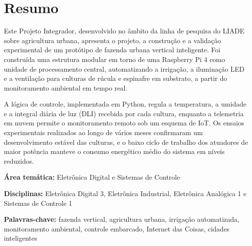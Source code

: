 \section*{Resumo}

Este Projeto Integrador, desenvolvido no âmbito da linha de pesquisa do LIADE sobre agricultura urbana, apresenta o projeto, a construção e a validação experimental de um protótipo de fazenda urbana vertical inteligente. Foi construída uma estrutura modular em torno de uma Raspberry Pi 4 como unidade de processamento central, automatizando a irrigação, a iluminação LED e a ventilação para culturas de rúcula e espinafre em substrato, a partir do monitoramento ambiental em tempo real.

A lógica de controle, implementada em Python, regula a temperatura, a umidade e a integral diária de luz (DLI) recebida por cada cultura, enquanto a telemetria em nuvem permite o monitoramento remoto sob um esquema de IoT. Os ensaios experimentais realizados ao longo de vários meses confirmaram um desenvolvimento estável das culturas, e o baixo ciclo de trabalho dos atuadores de maior potência manteve o consumo energético médio do sistema em níveis reduzidos.

\vspace{0.8cm}

\noindent\textbf{Área temática:} Eletrônica Digital e Sistemas de Controle

\vspace{0.4cm}

\noindent\textbf{Disciplinas:} Eletrônica Digital 3, Eletrônica Industrial, Eletrônica Analógica 1 e Sistemas de Controle 1

\vspace{0.4cm}

\noindent\textbf{Palavras-chave:} fazenda vertical, agricultura urbana, irrigação automatizada, monitoramento ambiental, controle embarcado, Internet das Coisas, cidades inteligentes